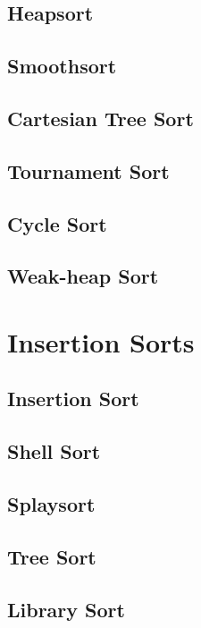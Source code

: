 				\subsection{Heapsort}

				\subsection{Smoothsort}

				\subsection{Cartesian Tree Sort}

				\subsection{Tournament Sort}

				\subsection{Cycle Sort}

				\subsection{Weak-heap Sort}

			\section{Insertion Sorts}
				\subsection{Insertion Sort}

				\subsection{Shell Sort}

				\subsection{Splaysort}

				\subsection{Tree Sort}

				\subsection{Library Sort}

